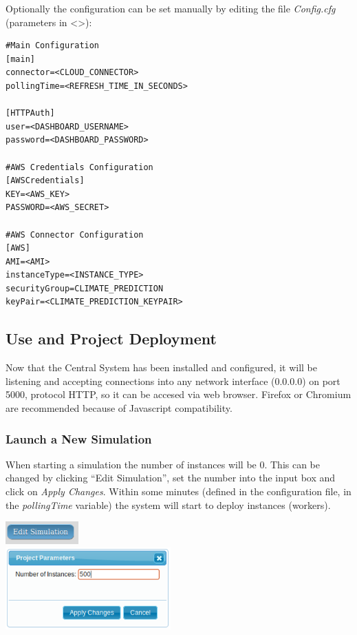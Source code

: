 \documentclass[journal abbreviation, manuscript]{copernicus}
\begin{document}
Optionally the configuration can be set manually by editing the file \textit{Config.cfg} (parameters in <>):

\begin{verbatim}
#Main Configuration
[main]
connector=<CLOUD_CONNECTOR>
pollingTime=<REFRESH_TIME_IN_SECONDS>

[HTTPAuth]
user=<DASHBOARD_USERNAME>
password=<DASHBOARD_PASSWORD>

#AWS Credentials Configuration
[AWSCredentials]
KEY=<AWS_KEY>
PASSWORD=<AWS_SECRET>

#AWS Connector Configuration
[AWS]
AMI=<AMI>
instanceType=<INSTANCE_TYPE>
securityGroup=CLIMATE_PREDICTION
keyPair=<CLIMATE_PREDICTION_KEYPAIR>
\end{verbatim}

\subsection{Use and Project Deployment}
Now that the Central System has been installed and configured, it will be listening and accepting connections into any network interface (0.0.0.0) on port 5000, protocol HTTP, so it can be accesed via web browser. Firefox or Chromium are recommended because of Javascript compatibility.

\subsubsection{Launch a New Simulation}
When starting a simulation the number of instances will be 0. This can be changed by clicking ``Edit Simulation'', set the number into the input box and click on \textit{Apply Changes}. Within some minutes (defined in the configuration file, in the \textit{pollingTime} variable) the system will start to deploy instances (workers).
\begin{center}
  \includegraphics[width=1.1in]{images/screenshots/simulation/simulation01.png} \\
  \includegraphics[width=2.5in]{images/screenshots/simulation/simulation02.png}
\end{center}
\end{document}
